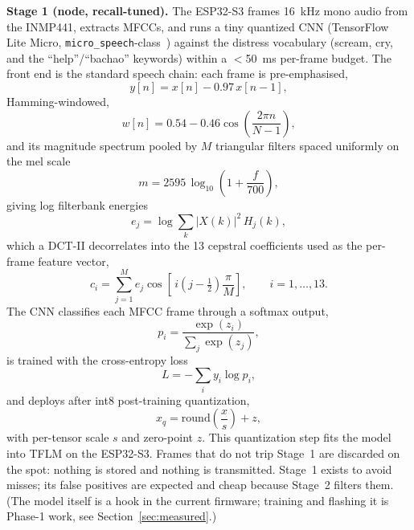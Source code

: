 \documentclass[conference]{IEEEtran}
\begin{document}
\textbf{Stage 1 (node, recall-tuned).} The ESP32-S3 frames 16~kHz mono
audio from the INMP441, extracts MFCCs, and runs a tiny quantized CNN
(TensorFlow Lite Micro, \texttt{micro\_speech}-class~\cite{tflm})
against the distress vocabulary (scream, cry, and the
``help''/``bachao'' keywords) within a $<$50~ms per-frame budget. The
front end is the standard speech chain: each frame is pre-emphasised,
\begin{equation}
\label{eq:preemph}
y[n] = x[n] - 0.97\,x[n-1],
\end{equation}
Hamming-windowed,
\begin{equation}
\label{eq:hamming}
w[n] = 0.54 - 0.46\cos\!\left(\frac{2\pi n}{N-1}\right),
\end{equation}
and its magnitude spectrum pooled by $M$ triangular filters spaced
uniformly on the mel scale
\begin{equation}
\label{eq:mel}
m = 2595\,\log_{10}\!\left(1 + \frac{f}{700}\right),
\end{equation}
giving log filterbank energies
\begin{equation}
\label{eq:fbank}
e_j = \log \sum_{k} \lvert X(k)\rvert^2\, H_j(k),
\end{equation}
which a DCT-II decorrelates into the 13 cepstral coefficients used as
the per-frame feature vector,
\begin{equation}
\label{eq:dct}
c_i = \sum_{j=1}^{M} e_j
\cos\!\left[\, i\left(j - \tfrac{1}{2}\right)\frac{\pi}{M}\right],
\qquad i = 1,\dots,13.
\end{equation}
The CNN classifies each MFCC frame through a softmax output,
\begin{equation}
\label{eq:softmax}
p_i = \frac{\exp(z_i)}{\sum_j \exp(z_j)},
\end{equation}
is trained with the cross-entropy loss
\begin{equation}
\label{eq:xent}
L = -\sum_i y_i \log p_i,
\end{equation}
and deploys after int8 post-training quantization,
\begin{equation}
\label{eq:quant}
x_q = \mathrm{round}\!\left(\frac{x}{s}\right) + z,
\end{equation}
with per-tensor scale $s$ and zero-point $z$. This quantization step
fits the model into TFLM on the ESP32-S3. Frames that do not trip
Stage~1 are discarded on the spot: nothing is stored and nothing is
transmitted. Stage~1 exists to avoid misses; its false positives are
expected and cheap because Stage~2 filters them. (The model itself is
a hook in the current firmware; training and flashing it is Phase-1
work, see Section~\ref{sec:measured}.)
\end{document}
